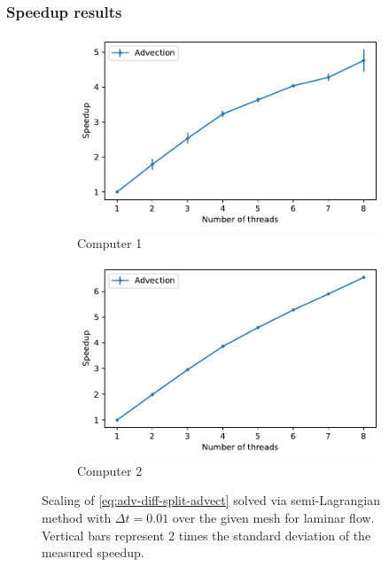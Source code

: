 \subsubsection{Speedup results}
\begin{figure}[H]
  \centering
  \begin{subfigure}[b]{0.49\textwidth}
      \centering
      \includegraphics[width=\textwidth]{Figures/LaminarAdvectionSpeedUpC1.pdf}
      \caption{Computer 1}
  \end{subfigure}
  \begin{subfigure}[b]{0.49\textwidth}
      \centering
      \includegraphics[width=\textwidth]{Figures/LaminarAdvectionSpeedUpC2.pdf}
      \caption{Computer 2}
  \end{subfigure}
\caption{Scaling of \cref{eq:adv-diff-split-advect} solved via semi-Lagrangian method with $\Delta t = 0.01$ over the given mesh for laminar flow. Vertical bars represent 2 times the standard deviation of the measured speedup.}\label{fig:advection_speedup_graph_laminar}
\end{figure}

